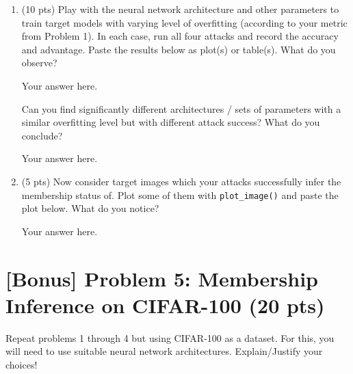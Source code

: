 %
\begin{enumerate}
%
	\item (10 pts) Play with the neural network architecture and other parameters to train target models with varying level of overfitting (according to your metric from Problem 1). In each case, run all four attacks and record the accuracy and advantage. Paste the results below as plot(s) or table(s). What do you observe? 
	
	\begin{answer}
	
		Your answer here.
		
	\end{answer}


	\medskip \noindent Can you find significantly different architectures / sets of parameters with a similar overfitting level but with different attack success? What do you conclude?
	
	\begin{answer}
	
		Your answer here.
		
	\end{answer}
	
	\item (5 pts) Now consider target images which your attacks successfully infer the membership status of. Plot some of them with \texttt{plot\_image()} and paste the plot below. What do you notice?
	
	\begin{answer}
	
		Your answer here.
		
	\end{answer}
	
%
\end{enumerate}

\newpage
\section*{[Bonus] Problem 5: Membership Inference on CIFAR-100 (20 pts)}
%

Repeat problems 1 through 4 but using CIFAR-100 as a dataset. For this, you will need to use suitable neural network architectures. Explain/Justify your choices!

